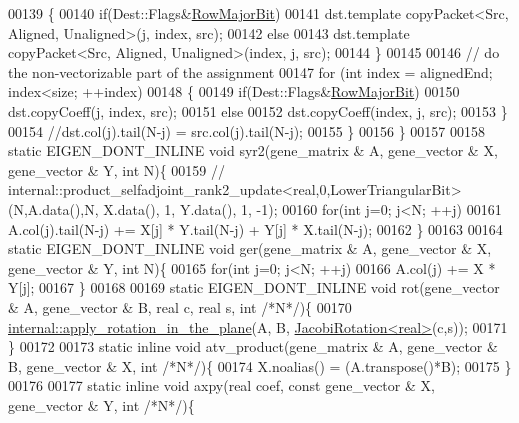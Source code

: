 \begin{DoxyCode}
00139       \{
00140         \textcolor{keywordflow}{if}(Dest::Flags&\hyperlink{group__flags_gae4f56c2a60bbe4bd2e44c5b19cbe8762}{RowMajorBit})
00141           dst.template copyPacket<Src, Aligned, Unaligned>(j, index, src);
00142         \textcolor{keywordflow}{else}
00143           dst.template copyPacket<Src, Aligned, Unaligned>(index, j, src);
00144       \}
00145 
00146       \textcolor{comment}{// do the non-vectorizable part of the assignment}
00147       \textcolor{keywordflow}{for} (\textcolor{keywordtype}{int} index = alignedEnd; index<size; ++index)
00148       \{
00149         \textcolor{keywordflow}{if}(Dest::Flags&\hyperlink{group__flags_gae4f56c2a60bbe4bd2e44c5b19cbe8762}{RowMajorBit})
00150           dst.copyCoeff(j, index, src);
00151         \textcolor{keywordflow}{else}
00152           dst.copyCoeff(index, j, src);
00153       \}
00154       \textcolor{comment}{//dst.col(j).tail(N-j) = src.col(j).tail(N-j);}
00155     \}
00156   \}
00157 
00158   \textcolor{keyword}{static} EIGEN\_DONT\_INLINE \textcolor{keywordtype}{void} syr2(gene\_matrix & A,  gene\_vector & X, gene\_vector & Y, \textcolor{keywordtype}{int}  N)\{
00159     \textcolor{comment}{// internal::product\_selfadjoint\_rank2\_update<real,0,LowerTriangularBit>(N,A.data(),N, X.data(), 1,
       Y.data(), 1, -1);}
00160     \textcolor{keywordflow}{for}(\textcolor{keywordtype}{int} j=0; j<N; ++j)
00161       A.col(j).tail(N-j) += X[j] * Y.tail(N-j) + Y[j] * X.tail(N-j);
00162   \}
00163 
00164   \textcolor{keyword}{static} EIGEN\_DONT\_INLINE \textcolor{keywordtype}{void} ger(gene\_matrix & A,  gene\_vector & X, gene\_vector & Y, \textcolor{keywordtype}{int}  N)\{
00165     \textcolor{keywordflow}{for}(\textcolor{keywordtype}{int} j=0; j<N; ++j)
00166       A.col(j) += X * Y[j];
00167   \}
00168 
00169   \textcolor{keyword}{static} EIGEN\_DONT\_INLINE \textcolor{keywordtype}{void} rot(gene\_vector & A,  gene\_vector & B, real c, real s, \textcolor{keywordtype}{int}  \textcolor{comment}{/*N*/})\{
00170     \hyperlink{namespace_eigen_1_1internal_a5f7738a5c56c9b9decf94d9728ba7906}{internal::apply\_rotation\_in\_the\_plane}(A, B, 
      \hyperlink{group___jacobi___module_class_eigen_1_1_jacobi_rotation}{JacobiRotation<real>}(c,s));
00171   \}
00172 
00173   \textcolor{keyword}{static} \textcolor{keyword}{inline} \textcolor{keywordtype}{void} atv\_product(gene\_matrix & A, gene\_vector & B, gene\_vector & X, \textcolor{keywordtype}{int}  \textcolor{comment}{/*N*/})\{
00174     X.noalias() = (A.transpose()*B);
00175   \}
00176 
00177   \textcolor{keyword}{static} \textcolor{keyword}{inline} \textcolor{keywordtype}{void} axpy(real coef, \textcolor{keyword}{const} gene\_vector & X, gene\_vector & Y, \textcolor{keywordtype}{int}  \textcolor{comment}{/*N*/})\{

\end{DoxyCode}
